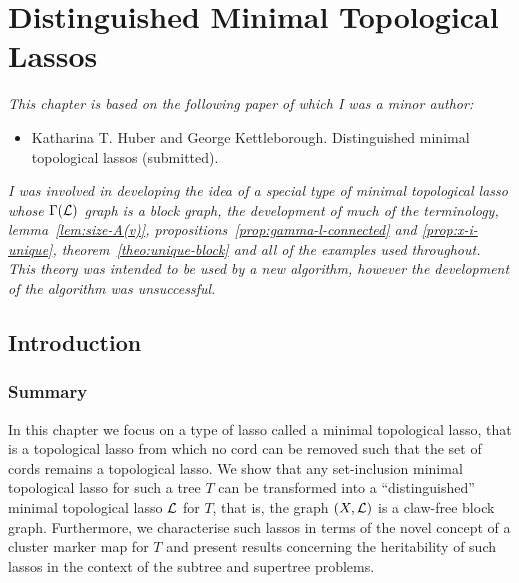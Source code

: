 \chapter{Distinguished Minimal Topological Lassos}
\label{cha:dist-minim-topl}

\textit{This chapter is based on the following paper of which I was a minor
  author:}

\vspace{0.5em}

\noindent

\begin{itemize}
\item Katharina T. Huber and George Kettleborough. Distinguished minimal
  topological lassos (submitted).
\end{itemize}

\vspace{1em}

\textit{I was involved in developing the idea of a special type of minimal
  topological lasso whose $\Gamma({\mathcal L})$ graph is a block graph, the
  development of much of the terminology, lemma~\ref{lem:size-A(v)},
  propositions~\ref{prop:gamma-l-connected} and \ref{prop:x-i-unique},
  theorem~\ref{theo:unique-block} and all of the examples used throughout.
  This theory was intended to be used by a new algorithm, however the
  development of the algorithm was unsuccessful.}
\newpage

\section{Introduction}

\subsection{Summary}

In this chapter we focus on a type of lasso called a minimal topological
lasso, that is a topological lasso from which no cord can be removed such that
the set of cords remains a topological lasso.  We show that any set-inclusion
minimal topological lasso for such a tree $T$ can be transformed into a
``distinguished'' minimal topological lasso ${\mathcal L}$ for $T$, that is, the graph
$(X,{\mathcal L})$ is a claw-free block graph. Furthermore, we characterise such lassos
in terms of the novel concept of a cluster marker map for $T$ and present
results concerning the heritability of such lassos in the context of the
subtree and supertree problems.

